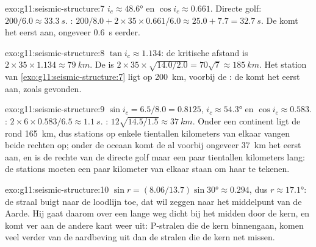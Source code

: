 \begin{solution}{exo:g11:seismic-structure:7}
$i_c \approx \ang{48.6}$ en $\cos i_c \approx 0.661$. Directe golf: $200/6.0
\approx \qty{33.3}{s}$. : $200/8.0 + 2 \times 35 \times 0.661/6.0
\approx 25.0 + 7.7 = \qty{32.7}{s}$. De  komt het eerst aan, ongeveer
\qty{0.6}{s} eerder.
\end{solution}

\begin{solution}{exo:g11:seismic-structure:8}
$\tan i_c \approx 1.134$: de kritische afstand is $2 \times 35 \times 1.134
\approx \qty{79}{km}$. De  is $2 \times 35 \times
\sqrt{14.0/2.0} = 70\sqrt 7 \approx \qty{185}{km}$. Het station van
\cref{exo:g11:seismic-structure:7} ligt op \qty{200}{km}, voorbij de
: de  komt het eerst aan, zoals gevonden.
\end{solution}

\begin{solution}{exo:g11:seismic-structure:9}
$\sin i_c = 6.5/8.0 = 0.8125$, $i_c \approx \ang{54.3}$ en $\cos i_c \approx
0.583$. : $2 \times 6 \times 0.583/6.5 \approx \qty{1.1}{s}$.
: $12\sqrt{14.5/1.5} \approx \qty{37}{km}$. Onder een continent
ligt de  rond \qty{165}{km}, dus stations op enkele tientallen
kilometers van elkaar vangen beide rechten op; onder de oceaan komt de  al
voorbij ongeveer \qty{37}{km} het eerst aan, en is de rechte van de directe golf
maar een paar tientallen kilometers lang: de stations moeten een paar kilometer
van elkaar staan om haar te tekenen.
\end{solution}

\begin{solution}{exo:g11:seismic-structure:10}
$\sin r = (8.06/13.7)\sin\ang{30} \approx 0.294$, dus $r \approx \ang{17.1}$:
de straal buigt naar de loodlijn toe, dat wil zeggen naar het middelpunt van de
Aarde. Hij gaat daarom over een lange weg dicht bij het midden door de kern, en
komt ver aan de andere kant weer uit: P-stralen die de kern binnengaan, komen veel
verder van de aardbeving uit dan de stralen die de kern net missen.
\end{solution}

